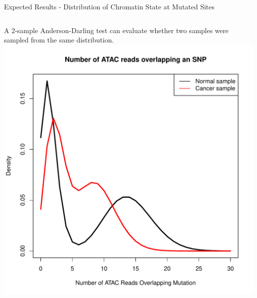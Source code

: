 \documentclass{beamer}
\begin{document}
\begin{frame}{Expected Results - Distribution of Chromatin State at Mutated Sites}
\begin{columns}
A 2-sample Anderson-Darling test can evaluate whether two samples were sampled from the same distribution.
\includegraphics[width=\linewidth]{chr_state.pdf}
\end{columns}
\end{frame}
\end{document}
